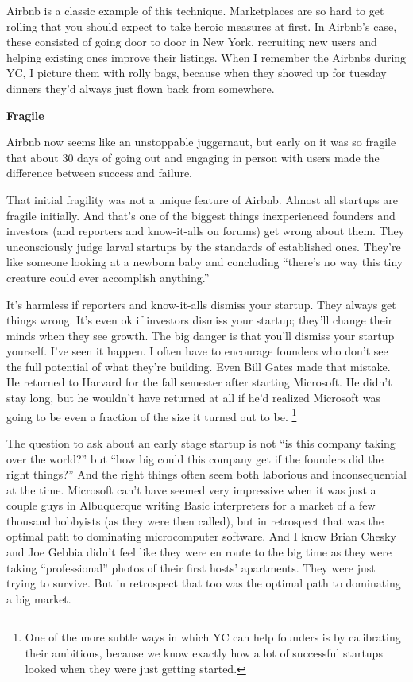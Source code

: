 \documentclass[12pt]{book}
\begin{document}
Airbnb is a classic example of this technique. Marketplaces are so hard
to get rolling that you should expect to take heroic measures at first.
In Airbnb's case, these consisted of going door to door in New York,
recruiting new users and helping existing ones improve their listings.
When I remember the Airbnbs during YC, I picture them with rolly bags,
because when they showed up for tuesday dinners they'd always just flown
back from somewhere.

\textbf{Fragile}

Airbnb now seems like an unstoppable juggernaut, but early on it was so
fragile that about 30 days of going out and engaging in person with
users made the difference between success and failure.

That initial fragility was not a unique feature of Airbnb. Almost all
startups are fragile initially. And that's one of the biggest things
inexperienced founders and investors (and reporters and know-it-alls on
forums) get wrong about them. They unconsciously judge larval startups
by the standards of established ones. They're like someone looking at a
newborn baby and concluding ``there's no way this tiny creature could
ever accomplish anything.''

It's harmless if reporters and know-it-alls dismiss your startup. They
always get things wrong. It's even ok if investors dismiss your startup;
they'll change their minds when they see growth. The big danger is that
you'll dismiss your startup yourself. I've seen it happen. I often have
to encourage founders who don't see the full potential of what they're
building. Even Bill Gates made that mistake. He returned to Harvard for
the fall semester after starting Microsoft. He didn't stay long, but he
wouldn't have returned at all if he'd realized Microsoft was going to be
even a fraction of the size it turned out to be. \footnote{One of the more subtle ways in which YC can help founders is by
calibrating their ambitions, because we know exactly how a lot of
successful startups looked when they were just getting started.}

The question to ask about an early stage startup is not ``is this
company taking over the world?'' but ``how big could this company get if
the founders did the right things?'' And the right things often seem
both laborious and inconsequential at the time. Microsoft can't have
seemed very impressive when it was just a couple guys in Albuquerque
writing Basic interpreters for a market of a few thousand hobbyists (as
they were then called), but in retrospect that was the optimal path to
dominating microcomputer software. And I know Brian Chesky and Joe
Gebbia didn't feel like they were en route to the big time as they were
taking ``professional'' photos of their first hosts' apartments. They
were just trying to survive. But in retrospect that too was the optimal
path to dominating a big market.
\end{document}

